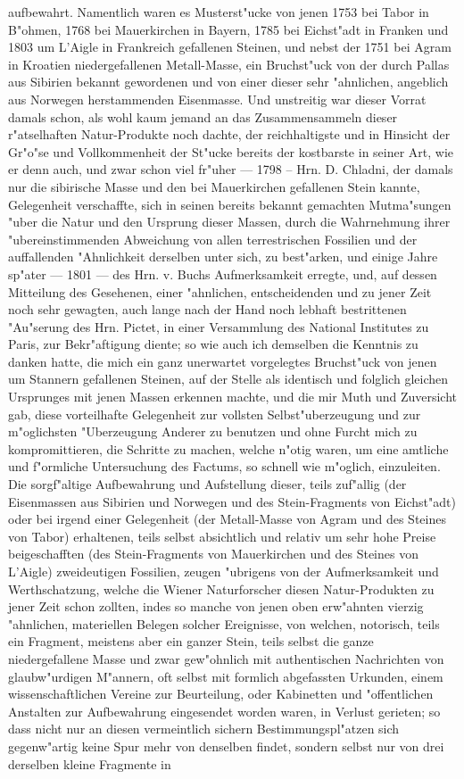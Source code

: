 \documentclass[a4paper, 11pt, oneside, german]{article}
\begin{document}
aufbewahrt. Namentlich waren es Musterst"ucke von jenen 1753 bei Tabor in B"ohmen, 1768 bei Mauerkirchen in Bayern, 1785 bei Eichst"adt in Franken und 1803 um L'Aigle in Frankreich gefallenen Steinen, und nebst der 1751 bei Agram in Kroatien niedergefallenen Metall-Masse, ein Bruchst"uck von der durch Pallas aus Sibirien bekannt gewordenen und von einer dieser sehr "ahnlichen, angeblich aus Norwegen herstammenden Eisenmasse. Und unstreitig war dieser Vorrat damals schon, als wohl kaum jemand an das Zusammensammeln dieser r"atselhaften Natur-Produkte noch dachte, der reichhaltigste und in Hinsicht der Gr"o"se und Vollkommenheit der St"ucke bereits der kostbarste in seiner Art, wie er denn auch, und zwar schon viel fr"uher --- 1798 -- Hrn. D. Chladni, der damals nur die sibirische Masse und den bei Mauerkirchen gefallenen Stein kannte, Gelegenheit verschaffte, sich in seinen bereits bekannt gemachten Mutma"sungen "uber die Natur und den Ursprung dieser Massen, durch die Wahrnehmung ihrer "ubereinstimmenden Abweichung von allen terrestrischen Fossilien und der auffallenden "Ahnlichkeit derselben unter sich, zu best"arken, und einige Jahre sp"ater --- 1801 --- des Hrn. v. Buchs Aufmerksamkeit erregte, und, auf dessen Mitteilung des Gesehenen, einer "ahnlichen, entscheidenden und zu jener Zeit noch sehr gewagten, auch lange nach der Hand noch lebhaft bestrittenen "Au"serung des Hrn. Pictet, in einer Versammlung des National Institutes zu Paris, zur Bekr"aftigung diente; so wie auch ich demselben die Kenntnis zu danken hatte, die mich ein ganz unerwartet vorgelegtes Bruchst"uck von jenen um Stannern gefallenen Steinen, auf der Stelle als identisch und folglich gleichen Ursprunges mit jenen Massen erkennen machte, und die mir Muth und Zuversicht gab, diese vorteilhafte Gelegenheit zur vollsten Selbst"uberzeugung und zur m"oglichsten "Uberzeugung Anderer zu benutzen und ohne Furcht mich zu kompromittieren, die Schritte zu machen, welche n"otig waren, um eine amtliche und f"ormliche Untersuchung des Factums, so schnell wie m"oglich, einzuleiten. Die sorgf"altige Aufbewahrung und Aufstellung dieser, teils zuf"allig (der Eisenmassen aus Sibirien und Norwegen und des Stein-Fragments von Eichst"adt) oder bei irgend einer Gelegenheit (der Metall-Masse von Agram und des Steines von Tabor) erhaltenen, teils selbst absichtlich und relativ um sehr hohe Preise beigeschafften (des Stein-Fragments von Mauerkirchen und des Steines von L'Aigle) zweideutigen Fossilien, zeugen "ubrigens von der Aufmerksamkeit und Werthschatzung, welche die Wiener Naturforscher diesen Natur-Produkten zu jener Zeit schon zollten, indes so manche von jenen oben erw"ahnten vierzig "ahnlichen, materiellen Belegen solcher Ereignisse, von welchen, notorisch, teils ein Fragment, meistens aber ein ganzer Stein, teils selbst die ganze niedergefallene Masse und zwar gew"ohnlich mit authentischen Nachrichten von glaubw"urdigen M"annern, oft selbst mit formlich abgefassten Urkunden, einem wissenschaftlichen Vereine zur Beurteilung, oder Kabinetten und "offentlichen Anstalten zur Aufbewahrung eingesendet worden waren, in Verlust gerieten; so dass nicht nur an diesen vermeintlich sichern Bestimmungspl"atzen sich gegenw"artig keine Spur mehr von denselben findet, sondern selbst nur von drei derselben kleine Fragmente in 
\end{document}
